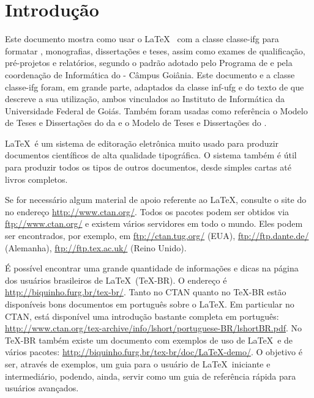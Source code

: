 
\chapter{Introdução}
\label{cap:intro}

Este documento mostra como usar o \LaTeX\ \cite{mittelbach2004latex} com a classe \textsf{classe-ifg} para formatar , monografias, dissertações e teses, assim como exames de qualificação, pré-projetos e relatórios, segundo o padrão adotado pelo Programa de  e pela coordenação de Informática do  - Câmpus Goiânia. Este documento e a classe \textsf{classe-ifg} foram, em grande parte, adaptados da classe \textsf{inf-ufg} e do texto de  que descreve a sua utilização, ambos vinculados ao Instituto de Informática da Universidade Federal de Goiás. Também foram usadas como referência o Modelo de Teses e Dissertações do  da  \cite{icmc-usp} e o Modelo de Teses e Dissertações do  \cite{inpe}.

\LaTeX\ é um sistema de editoração eletrônica muito usado para produzir documentos científicos de alta qualidade tipográfica. O sistema também é útil para produzir todos os tipos de outros documentos, desde simples cartas até livros completos.

Se for necessário algum material de apoio referente ao \LaTeX, consulte o site do  no endereço \url{http://www.ctan.org/}. Todos os pacotes podem ser obtidos via  \url{ftp://www.ctan.org/} e existem vários servidores em todo o mundo. Eles podem ser encontrados, por exemplo, em \url{ftp://ctan.tug.org/} (EUA), \url{ftp://ftp.dante.de/} (Alemanha), \url{ftp://ftp.tex.ac.uk/} (Reino Unido).

É possível encontrar uma grande quantidade de informações e dicas na página dos usuários brasileiros de \LaTeX\ (\TeX-BR). O endereço é \url{http://biquinho.furg.br/tex-br/}. Tanto no CTAN quanto no \TeX-BR estão disponíveis bons documentos em português sobre o \LaTeX. Em particular no CTAN, está disponível uma introdução bastante completa em português: \url{http://www.ctan.org/tex-archive/info/lshort/portuguese-BR/lshortBR.pdf}. No \TeX-BR também existe um documento com exemplos de uso de \LaTeX\ e de vários pacotes: \url{http://biquinho.furg.br/tex-br/doc/LaTeX-demo/}. O objetivo é ser, através de exemplos, um guia para o usuário de \LaTeX\ iniciante e intermediário, podendo, ainda, servir como um guia de referência rápida para usuários avançados.

